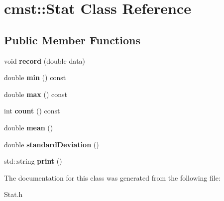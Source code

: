 \hypertarget{classcmst_1_1_stat}{}\section{cmst\+:\+:Stat Class Reference}
\label{classcmst_1_1_stat}
\subsection*{Public Member Functions}
\begin{DoxyCompactItemize}
\item 
void {\bfseries record} (double data)\hypertarget{classcmst_1_1_stat_ab1e2fe7c367da505a6b5f1fb5eb619d2}{}\label{classcmst_1_1_stat_ab1e2fe7c367da505a6b5f1fb5eb619d2}

\item 
double {\bfseries min} () const \hypertarget{classcmst_1_1_stat_a1a6a92dee526145fb289d79a94afe3ae}{}\label{classcmst_1_1_stat_a1a6a92dee526145fb289d79a94afe3ae}

\item 
double {\bfseries max} () const \hypertarget{classcmst_1_1_stat_ab42898f6611aa9f1ad028f99c3d4242a}{}\label{classcmst_1_1_stat_ab42898f6611aa9f1ad028f99c3d4242a}

\item 
int {\bfseries count} () const \hypertarget{classcmst_1_1_stat_ab8c6707fa4739fda8b27a2481df25c35}{}\label{classcmst_1_1_stat_ab8c6707fa4739fda8b27a2481df25c35}

\item 
double {\bfseries mean} ()\hypertarget{classcmst_1_1_stat_aa40d8d516e7f866146d91866d63faf2b}{}\label{classcmst_1_1_stat_aa40d8d516e7f866146d91866d63faf2b}

\item 
double {\bfseries standard\+Deviation} ()\hypertarget{classcmst_1_1_stat_abfbaefc3a4174643a2eb282251fd86a5}{}\label{classcmst_1_1_stat_abfbaefc3a4174643a2eb282251fd86a5}

\item 
std\+::string {\bfseries print} ()\hypertarget{classcmst_1_1_stat_a03d1a0f52e2ea72cfab11a426726aea4}{}\label{classcmst_1_1_stat_a03d1a0f52e2ea72cfab11a426726aea4}

\end{DoxyCompactItemize}


The documentation for this class was generated from the following file\+:\begin{DoxyCompactItemize}
\item 
Stat.\+h\end{DoxyCompactItemize}
